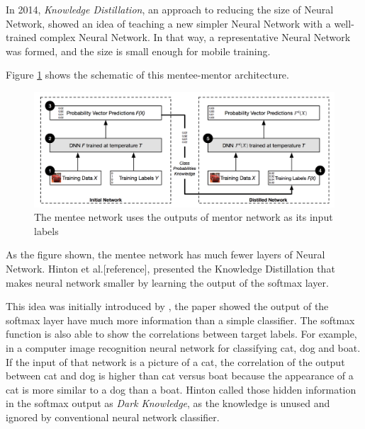 \documentclass[article]{aaltoseries}
\begin{document}
In 2014, \emph{Knowledge Distillation}, an approach to reducing the size of Neural Network, 
showed an idea of teaching a new simpler Neural Network with a well-trained complex Neural Network.
In that way, a representative Neural Network was formed, and the size is small enough for mobile training.

Figure \ref{fig:mentor_pic}\cite{Distillation:2015} shows the schematic of this mentee-mentor architecture. 

\begin{figure}[t!]
  \begin{center}
    \includegraphics[width=1\textwidth]{figures/mentor_mentee}
    \caption{The mentee network uses the outputs of mentor network as its input labels}
    \label{fig:mentor_pic}
  \end{center}
\end{figure}

As the figure shown, the mentee network has much fewer layers of Neural Network. 
Hinton et al.[reference], presented the Knowledge Distillation that makes neural network smaller by learning the 
output of the softmax layer\cite{SoftMax}. 

This idea was initially introduced by \cite{Caruana2006}, the paper showed 
the output of the softmax layer have much more information than a simple classifier. 
The softmax function is also able to show the correlations between
target labels. For example, in a computer image recognition neural network for classifying cat, dog and boat.
If the input of that network is a picture of a cat, the correlation of the output
between cat and dog is higher than cat versus boat because the appearance of a cat is more similar to a dog than a boat.
Hinton called those hidden information in the softmax output as \emph{Dark Knowledge}, 
as the knowledge is unused and ignored by conventional neural network classifier.
\end{document}
